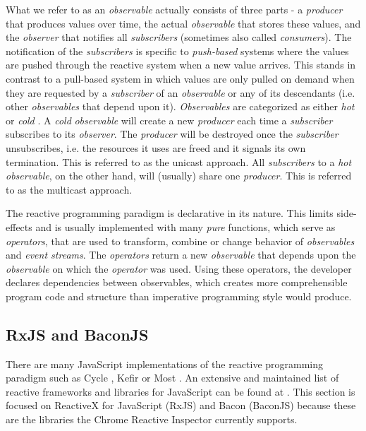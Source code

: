 	What we refer to as an \emph{observable} actually consists of three parts - a \emph{producer} that produces values over time, the actual \emph{observable} that stores these values, and the \emph{observer} that notifies all \emph{subscribers} (sometimes also called \emph{consumers}). The notification of the \emph{subscribers} is specific to \emph{push-based} systems where the values are pushed through the reactive system when a new value arrives. This stands in contrast to a pull-based system in which values are only pulled on demand when they are requested by a \emph{subscriber} of an \emph{observable} or any of its descendants (i.e. other \emph{observables} that depend upon it).
	\emph{Observables} are categorized as either \emph{hot} or \emph{cold} \cite{HotVsCold}. A \emph{cold} \emph{observable} will create a new \emph{producer} each time a \emph{subscriber} subscribes to its \emph{observer}. The \emph{producer} will be destroyed once the \emph{subscriber} unsubscribes, i.e. the resources it uses are freed and it signals its own termination. This is referred to as the unicast approach. All \emph{subscribers} to a \emph{hot} \emph{observable}, on the other hand, will (usually) share one \emph{producer}. This is referred to as the multicast approach.
	
	The reactive programming paradigm is declarative in its nature. This limits side-effects and is usually implemented with many \emph{pure} functions, which serve as \emph{operators}, that are used to transform, combine or change behavior of \emph{observables} and \emph{event streams}. The \emph{operators} return a new \emph{observable} that depends upon the \emph{observable} on which the \emph{operator} was used. Using these operators, the developer declares dependencies between observables, which creates more comprehensible program code and structure \cite[Why Reactive Programming?]{ReactiveInspector} than imperative programming style would produce.

	\subsection{RxJS and BaconJS}
	There are many JavaScript implementations of the reactive programming paradigm such as Cycle \cite{CycleJS}, Kefir \cite{KefirJS} or Most \cite{MostJS}. An extensive and maintained list of reactive frameworks and libraries for JavaScript can be found at \cite{FRPJSList}. This section is focused on ReactiveX for JavaScript (RxJS) \cite{RxJS} and Bacon (BaconJS) \cite{BaconJS} because these are the libraries the Chrome Reactive Inspector currently supports.
	
